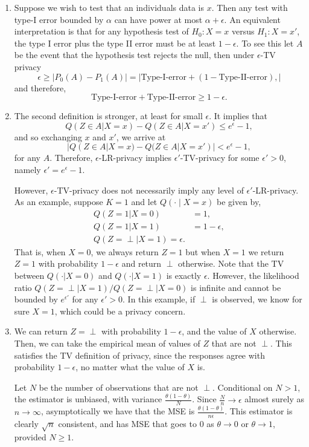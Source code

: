 \begin{enumerate}[label=(\alph*)]
\item
  Suppose we wish to test that an individuals data is $x$. Then any test with type-I error bounded by $\alpha$ can have power at most $\alpha + \epsilon$. An equivalent interpretation is that for any hypothesis test of $H_0 : X=x$ versus $H_1: X=x'$, the type I error plus the type II error must be at least $1-\epsilon$. To see this let $A$ be the event that the hypothesis test rejects the null, then under $\epsilon$-TV privacy 
  \[\epsilon \geq \vert P_0(A)- P_1(A) \vert = \vert \text{Type-I-error} + (1- \text{Type-II-error} ), \vert\] 
  and therefore,
  \[  \text{Type-I-error}+ \text{Type-II-error} \geq 1-\epsilon.\]
\item 
  The second definition is stronger, at least for small $\epsilon$. It implies that 
  \[
    Q(Z \in A | X = x) - Q(Z \in A | X = x') \le e^\epsilon - 1,
  \] 
  and so exchanging $x$ and $x'$, we arrive at 
  \[
    |Q(Z \in A | X = x) - Q(Z \in A | X = x')| < e^{\epsilon} - 1,
  \] 
  for any $A$. Therefore, $\epsilon$-LR-privacy implies $\epsilon'$-TV-privacy for some $\epsilon'>0$, namely $\epsilon'=e^{\epsilon} - 1$. 
  
  However, $\epsilon$-TV-privacy does not necessarily imply any level of $\epsilon'$-LR-privacy. As an example, suppose $K = 1$ and let $Q(\cdot \mid X=x)$ be given by,
  \begin{align*}
    Q(Z=1|X=0)&=1, \\
    Q(Z=1|X=1)&=1-\epsilon,\\
    Q(Z=\perp|X=1)=\epsilon.
  \end{align*} 
  That is, when $X=0$, we always return $Z=1$ but when $X=1$ we return $Z=1$ with probability $1-\epsilon$ and return $\perp$ otherwise.  Note that the TV between $Q(\cdot |X=0)$ and $Q(\cdot | X=1)$ is exactly $\epsilon$. However, the likelihood ratio $Q(Z = \perp | X = 1) / Q(Z = \perp | X = 0)$ is infinite and cannot be bounded by $e^{\epsilon'}$ for any $\epsilon'>0$. In this example, if $\perp$ is observed, we know for sure $X=1$, which could be a privacy concern.
\item
  We can return $Z = \perp$ with probability $1 - \epsilon$, and the value of $X$ otherwise. Then, we can take the empirical mean of values of $Z$ that are not $\perp$. This satisfies the TV definition of privacy, since the responses agree with probability $1 - \epsilon$, no matter what the value of $X$ is. 

  Let $N$ be the number of observations that are not $\perp$. Conditional on $N > 1$, the estimator is unbiased, with variance $\frac{\theta(1 - \theta)}{N}$. Since $\frac{N}{n} \to \epsilon$ almost surely as $n \to \infty$, asymptotically we have that the MSE is $\frac{\theta(1 - \theta)}{n \epsilon}$. This estimator is clearly $\sqrt{n}$ consistent, and has MSE that goes to 0 as $\theta \to 0$ or $\theta \to 1$, provided $N \ge 1$.


\end{enumerate}
